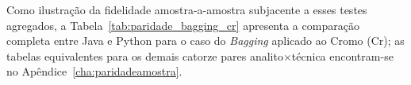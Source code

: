 Como ilustração da fidelidade amostra-a-amostra subjacente a esses testes
agregados, a Tabela~\ref{tab:paridade_bagging_cr} apresenta a comparação
completa entre Java e Python para o caso do \textit{Bagging} aplicado ao
Cromo (Cr); as tabelas equivalentes para os demais catorze pares
analito$\times$técnica encontram-se no Apêndice~\ref{cha:paridadeamostra}.

